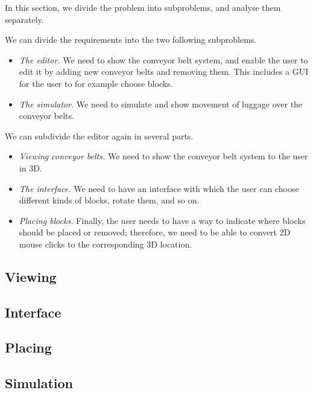 In this section, we divide the problem into subproblems, and analyse them separately.

We can divide the requirements into the two following subproblems.
\begin{itemize}
 \item \emph{The editor.} We need to show the conveyor belt system, and enable the user to edit it by adding new conveyor belts and removing them. This includes a GUI for the user to for example choose blocks.
 \item \emph{The simulator.} We need to simulate and show movement of luggage over the conveyor belts.
\end{itemize}
We can subdivide the editor again in several parts.
\begin{itemize}
 \item \emph{Viewing conveyor belts.} We need to show the conveyor belt system to the user in 3D.
 \item \emph{The interface.} We need to have an interface with which the user can choose different kinds of blocks, rotate them, and so on.
 \item \emph{Placing blocks.} Finally, the user needs to have a way to indicate where blocks should be placed or removed; therefore, we need to be able to convert 2D mouse clicks to the corresponding 3D location.
\end{itemize}

\subsection{Viewing}
\label{subsec:analysis-viewing}


\subsection{Interface}
\label{subsec:analysis-interface}


\subsection{Placing}
\label{subsec:analysis-placing}


\subsection{Simulation}
\label{subsec:analysis-simulation}
